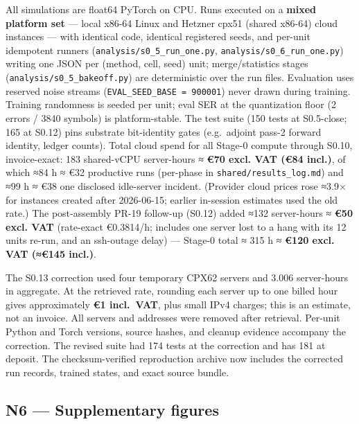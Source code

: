 \documentclass[
  10pt,
]{article}
\begin{document}
All simulations are float64 PyTorch on CPU. Runs executed on a
\textbf{mixed platform set} --- local x86-64 Linux and Hetzner cpx51
(shared x86-64) cloud instances --- with identical code, identical
registered seeds, and per-unit idempotent runners
(\texttt{analysis/s0\_5\_run\_one.py},
\texttt{analysis/s0\_6\_run\_one.py}) writing one JSON per (method,
cell, seed) unit; merge/statistics stages
(\texttt{analysis/s0\_5\_bakeoff.py}) are deterministic over the run
files. Evaluation uses reserved noise streams
(\texttt{EVAL\_SEED\_BASE\ =\ 900001}) never drawn during training.
Training randomness is seeded per unit; eval SER at the quantization
floor (2 errors / 3840 symbols) is platform-stable. The test suite (150
tests at S0.5-close; 165 at S0.12) pins substrate bit-identity gates
(e.g.~adjoint pass-2 forward identity, ledger counts). Total cloud spend
for all Stage-0 compute through S0.10, invoice-exact: 183 shared-vCPU
server-hours ≈ \textbf{€70 excl. VAT (€84 incl.)}, of which ≈84 h ≈ €32
productive runs (per-phase in \texttt{shared/results\_log.md}) and ≈99 h
≈ €38 one disclosed idle-server incident. (Provider cloud prices rose
≈3.9× for instances created after 2026-06-15; earlier in-session
estimates used the old rate.) The post-assembly PR-19 follow-up (S0.12)
added ≈132 server-hours ≈ \textbf{€50 excl. VAT} (rate-exact €0.3814/h;
includes one server lost to a hang with its 12 units re-run, and an
ssh-outage delay) --- Stage-0 total ≈ 315 h ≈ \textbf{€120 excl. VAT
(≈€145 incl.)}.

The S0.13 correction used four temporary CPX62 servers and 3.006
server-hours in aggregate. At the retrieved rate, rounding each server
up to one billed hour gives approximately \textbf{€1 incl.~VAT}, plus
small IPv4 charges; this is an estimate, not an invoice. All servers and
addresses were removed after retrieval. Per-unit Python and Torch
versions, source hashes, and cleanup evidence accompany the correction.
The revised suite had 174 tests at the correction and has 181 at
deposit. The checksum-verified reproduction archive now includes the
corrected run records, trained states, and exact source bundle.

\subsection{N6 --- Supplementary
figures}\label{n6-supplementary-figures}
\end{document}
